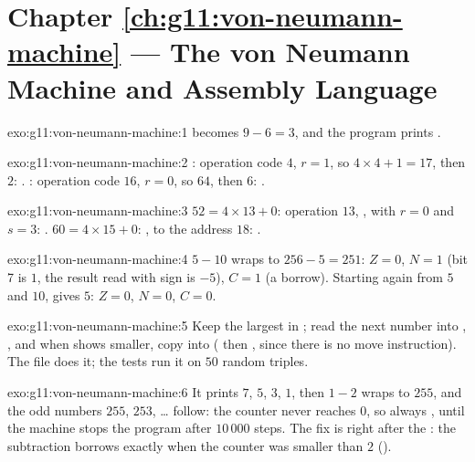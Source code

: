 \section*{Chapter \ref{ch:g11:von-neumann-machine} --- The von Neumann Machine and Assembly Language}

\begin{solution}{exo:g11:von-neumann-machine:1}
 becomes $9 - 6 = 3$, and the program prints .
\end{solution}

\begin{solution}{exo:g11:von-neumann-machine:2}
: operation code $4$, $r = 1$, so $4 \times 4 + 1 = 17$, then $2$: .
: operation code $16$, $r = 0$, so $64$, then $6$: .
\end{solution}

\begin{solution}{exo:g11:von-neumann-machine:3}
$52 = 4 \times 13 + 0$: operation $13$, , with $r = 0$ and $s = 3$: . $60 = 4 \times 15 +
0$: , to the address $18$: .
\end{solution}

\begin{solution}{exo:g11:von-neumann-machine:4}
$5 - 10$ wraps to $256 - 5 = 251$: $Z = 0$, $N = 1$ (bit 7 is $1$, the result read with sign is $-5$), $C = 1$ (a
borrow). Starting again from $5$ and $10$,  gives $5$: $Z = 0$, $N = 0$, $C = 0$.
\end{solution}

\begin{solution}{exo:g11:von-neumann-machine:5}
Keep the largest in ; read the next number into , , and when  shows
 smaller, copy  into  ( then , since there is no move
instruction). The file  does it; the tests run it on $50$ random triples.
\end{solution}

\begin{solution}{exo:g11:von-neumann-machine:6}
It prints $7$, $5$, $3$, $1$, then $1 - 2$ wraps to $255$, and the odd numbers $255$, $253$, \dots{} follow: the
counter never reaches $0$, so  always , until the machine stops the program after $10\,000$ steps.
The fix is  right after the : the subtraction borrows exactly when the counter was smaller
than $2$ ().
\end{solution}

